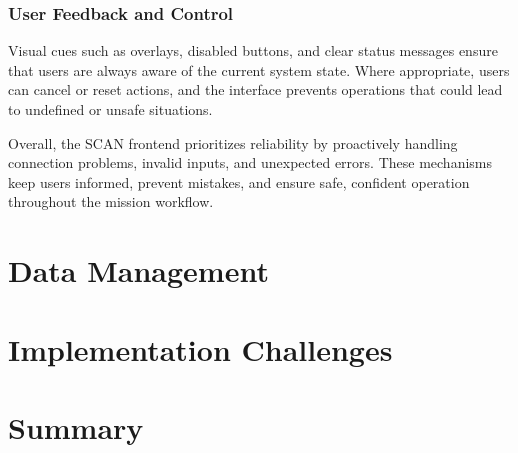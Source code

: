 \subsubsection{User Feedback and Control}
Visual cues such as overlays, disabled buttons, and clear status messages ensure that users are always aware of the current system state. Where appropriate, users can cancel or reset actions, and the interface prevents operations that could lead to undefined or unsafe situations.

Overall, the SCAN frontend prioritizes reliability by proactively handling connection problems, invalid inputs, and unexpected errors. These mechanisms keep users informed, prevent mistakes, and ensure safe, confident operation throughout the mission workflow.

\section{Data Management}

\section{Implementation Challenges}

\section{Summary}
